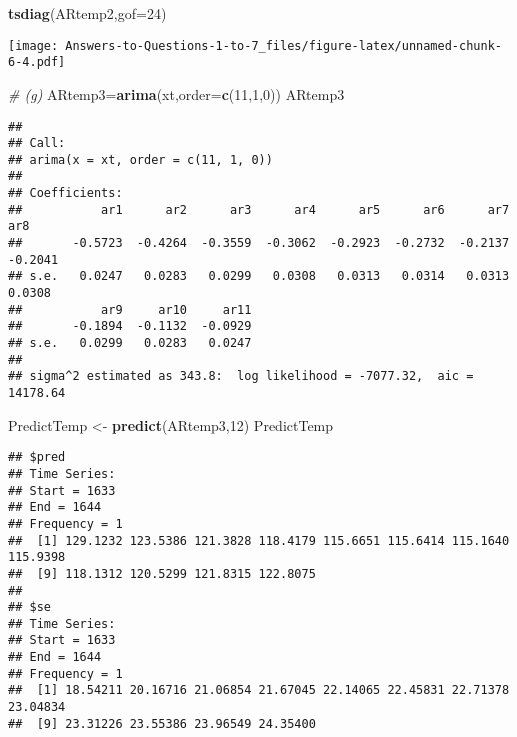 \documentclass[
]{article}
\newenvironment{Shaded}{\begin{snugshade}}{\end{snugshade}}
\newcommand{\AttributeTok}[1]{\textcolor[rgb]{0.13,0.29,0.53}{#1}}
\newcommand{\CommentTok}[1]{\textcolor[rgb]{0.56,0.35,0.01}{\textit{#1}}}
\newcommand{\DecValTok}[1]{\textcolor[rgb]{0.00,0.00,0.81}{#1}}
\newcommand{\FunctionTok}[1]{\textcolor[rgb]{0.13,0.29,0.53}{\textbf{#1}}}
\newcommand{\NormalTok}[1]{#1}
\newcommand{\OtherTok}[1]{\textcolor[rgb]{0.56,0.35,0.01}{#1}}
\begin{document}
\begin{Shaded}
\begin{Highlighting}[]
\FunctionTok{tsdiag}\NormalTok{(ARtemp2,}\AttributeTok{gof=}\DecValTok{24}\NormalTok{)}
\end{Highlighting}
\end{Shaded}

\texttt{[image: Answers-to-Questions-1-to-7\_files/figure-latex/unnamed-chunk-6-4.pdf]}

\begin{Shaded}
\begin{Highlighting}[]
\CommentTok{\# (g)}
\NormalTok{ARtemp3}\OtherTok{=}\FunctionTok{arima}\NormalTok{(xt,}\AttributeTok{order=}\FunctionTok{c}\NormalTok{(}\DecValTok{11}\NormalTok{,}\DecValTok{1}\NormalTok{,}\DecValTok{0}\NormalTok{))}
\NormalTok{ARtemp3}
\end{Highlighting}
\end{Shaded}

\begin{verbatim}
## 
## Call:
## arima(x = xt, order = c(11, 1, 0))
## 
## Coefficients:
##           ar1      ar2      ar3      ar4      ar5      ar6      ar7      ar8
##       -0.5723  -0.4264  -0.3559  -0.3062  -0.2923  -0.2732  -0.2137  -0.2041
## s.e.   0.0247   0.0283   0.0299   0.0308   0.0313   0.0314   0.0313   0.0308
##           ar9     ar10     ar11
##       -0.1894  -0.1132  -0.0929
## s.e.   0.0299   0.0283   0.0247
## 
## sigma^2 estimated as 343.8:  log likelihood = -7077.32,  aic = 14178.64
\end{verbatim}

\begin{Shaded}
\begin{Highlighting}[]
\NormalTok{PredictTemp }\OtherTok{\textless{}{-}} \FunctionTok{predict}\NormalTok{(ARtemp3,}\DecValTok{12}\NormalTok{)}
\NormalTok{PredictTemp}
\end{Highlighting}
\end{Shaded}

\begin{verbatim}
## $pred
## Time Series:
## Start = 1633 
## End = 1644 
## Frequency = 1 
##  [1] 129.1232 123.5386 121.3828 118.4179 115.6651 115.6414 115.1640 115.9398
##  [9] 118.1312 120.5299 121.8315 122.8075
## 
## $se
## Time Series:
## Start = 1633 
## End = 1644 
## Frequency = 1 
##  [1] 18.54211 20.16716 21.06854 21.67045 22.14065 22.45831 22.71378 23.04834
##  [9] 23.31226 23.55386 23.96549 24.35400
\end{verbatim}
\end{document}
